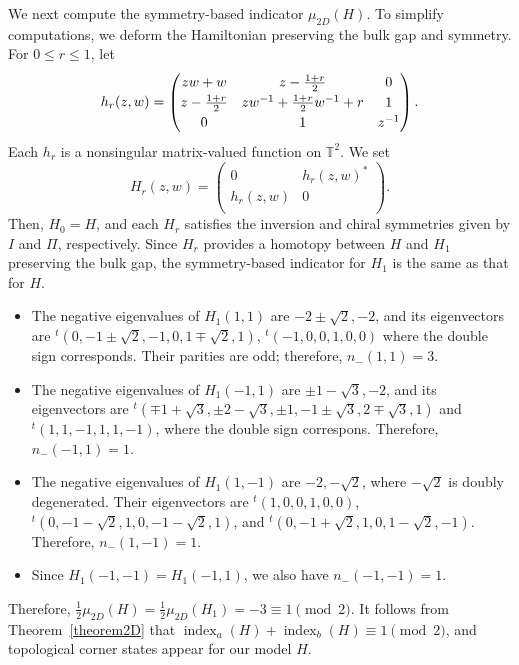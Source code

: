 \documentclass{amsart}
\theoremstyle{plain}
\theoremstyle{definition}
\theoremstyle{remark}
\newcommand{\T}{\mathbb{T}}
\DeclareMathOperator{\ind}{\mathrm{index}}
\begin{document}
We next compute the symmetry-based indicator $\mu_{2D}(H)$.
To simplify computations, we deform the Hamiltonian preserving the bulk gap and symmetry.
For $0 \leq r \leq 1$, let
\begin{equation*}
	h_r(z,w) =
{\renewcommand{\arraystretch}{1.2}
\begin{pmatrix}
zw + w & z - \frac{1+r}{2} & 0 \\
z - \frac{1+r}{2} & zw^{-1} + \frac{1+r}{2}w^{-1} + r & 1 \\
0 & 1 & z^{-1} \\
\end{pmatrix}.}
\end{equation*}
Each $h_r$ is a nonsingular matrix-valued function on $\T^2$.
We set
\begin{equation*}
	H_r(z,w)=
\begin{pmatrix}
0 & h_r(z,w)^* \\
h_r(z,w) & 0 \\
\end{pmatrix}.
\end{equation*}
Then, $H_0 = H$, and each $H_r$ satisfies the inversion and chiral symmetries given by $I$ and $\Pi$, respectively.
Since $H_r$ provides a homotopy between $H$ and $H_1$ preserving the bulk gap, the symmetry-based indicator for $H_1$ is the same as that for $H$.

\begin{itemize}
\item The negative eigenvalues of $H_1(1,1)$ are $-2 \pm \sqrt2, -2$, and its eigenvectors are
$^t\!(0, -1 \pm \sqrt{2}, -1, 0, 1 \mp \sqrt{2}, 1)$, $^t\!(-1,0,0,1,0,0)$ where the double sign corresponds.
Their parities are odd; therefore, $n_-(1,1)=3$.
\item The negative eigenvalues of $H_1(-1,1)$ are $\pm1-\sqrt{3},-2$, and its eigenvectors are $^t\!(\mp 1+\sqrt{3},\pm 2 - \sqrt{3},\pm1, -1 \pm \sqrt{3},2\mp \sqrt{3},1)$ and $^t\!(1,1,-1,1,1,-1)$, where the double sign correspons.
Therefore, $n_-(-1,1)=1$.
\item The negative eigenvalues of $H_1(1,-1)$ are $-2, -\sqrt{2}$, where $-\sqrt{2}$ is doubly degenerated.
Their eigenvectors are $^t\!(1,0,0,1,0,0)$, $^t\!(0, -1-\sqrt{2},1,0,-1-\sqrt{2},1)$, and $^t\!(0,-1+\sqrt{2},1,0,1-\sqrt{2},-1)$.
Therefore, $n_-(1,-1)=1$.
\item Since $H_1(-1,-1) = H_1(-1,1)$, we also have $n_-(-1,-1)=1$.
\end{itemize}
Therefore, $\frac{1}{2}\mu_{2D}(H) = \frac{1}{2}\mu_{2D}(H_1) = -3 \equiv 1 \pmod2$.
It follows from Theorem~\ref{theorem2D} that $\ind_a(H) + \ind_b(H) \equiv 1 \pmod 2$,
and topological corner states appear for our model $H$.
\end{document}

